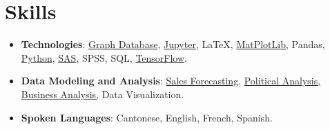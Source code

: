 \documentclass[letterpaper,11pt]{article}
\newcommand{\resumeItem}[2]{
  \item\small{
    \textbf{#1}{: #2 \vspace{-2pt}}
  }
}
\newcommand{\resumeSubItem}[2]{\resumeItem{#1}{#2}\vspace{-4pt}}
\newcommand{\resumeSubHeadingListStart}{\begin{itemize}[leftmargin=*]}
\newcommand{\resumeSubHeadingListEnd}{\end{itemize}}
\begin{document}
\section{Skills}
\resumeSubHeadingListStart
  \resumeSubItem{Technologies}
    {{\href{https://docs.jnapolitano.io/parts/data/graph-database/index.html}{Graph Database}}, {\href{https://docs.jnapolitano.io/parts/analysis/business-analysis/project-retail-sales-forecasting/code-base/SalesForcasting.html}{Jupyter}}, LaTeX, {\href{https://docs.jnapolitano.io/parts/analysis/business-analysis/project-retail-sales-forecasting/code-base/SalesForcasting.html}{MatPlotLib}}, Pandas, {\href{https://docs.jnapolitano.io/index.html}{Python}}, {\href{https://docs.jnapolitano.io/parts/data/experimental-design/index.html}{SAS}, SPSS, SQL, \href{https://docs.jnapolitano.io/parts/ml-ai/index.html}{TensorFlow}}.}
  \resumeSubItem{Data Modeling and Analysis}
    {\href{https://docs.jnapolitano.io/parts/analysis/business-analysis/project-retail-sales-forecasting/code-base/SalesForcasting.html}{Sales Forecasting,} {\href{https://docs.jnapolitano.io/parts/analysis/political-analysis/index.html}{Political Analysis,}} {\href{https://docs.jnapolitano.io/parts/analysis/business-analysis/index.html}{Business Analysis,}} Data Visualization.}
  \resumeSubItem{Spoken Languages}
    {Cantonese, English, French, Spanish.}
\resumeSubHeadingListEnd

\end{document}

